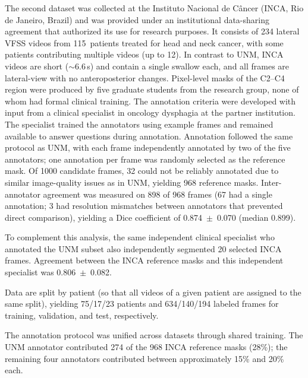 \documentclass[a4paper,fleqn]{cas-dc}
\begin{document}
The second dataset was collected at the Instituto Nacional de C\^ancer (INCA, Rio de Janeiro, Brazil) and was provided under an institutional data-sharing agreement that authorized its use for research purposes.
It consists of 234 lateral VFSS videos from 115~patients treated for head and neck cancer, with some patients contributing multiple videos (up to 12).
In contrast to UNM, INCA videos are short (${\sim}$6.6\,s) and contain a single swallow each, and all frames are lateral-view with no anteroposterior changes.
Pixel-level masks of the C2--C4 region were produced by five graduate students from the research group, none of whom had formal clinical training. The annotation criteria were developed with input from a clinical specialist in oncology dysphagia at the partner institution. The specialist trained the annotators using example frames and remained available to answer questions during annotation.
Annotation followed the same protocol as UNM, with each frame independently annotated by two of the five annotators; one annotation per frame was randomly selected as the reference mask.
Of 1000 candidate frames, 32 could not be reliably annotated due to similar image-quality issues as in UNM, yielding 968 reference masks.
Inter-annotator agreement was measured on 898 of 968 frames (67 had a single annotation; 3 had resolution mismatches between annotators that prevented direct comparison), yielding a Dice coefficient of 0.874~$\pm$~0.070 (median 0.899).

To complement this analysis, the same independent clinical specialist who annotated the UNM subset also independently segmented 20 selected INCA frames. Agreement between the INCA reference masks and this independent specialist was 0.806~$\pm$~0.082.

Data are split by patient (so that all videos of a given patient are assigned to the same split), yielding 75/17/23 patients and 634/140/194 labeled frames for training, validation, and test, respectively.

The annotation protocol was unified across datasets through shared training. The UNM annotator contributed 274 of the 968 INCA reference masks (28\%); the remaining four annotators contributed between approximately 15\% and 20\% each.
\end{document}
